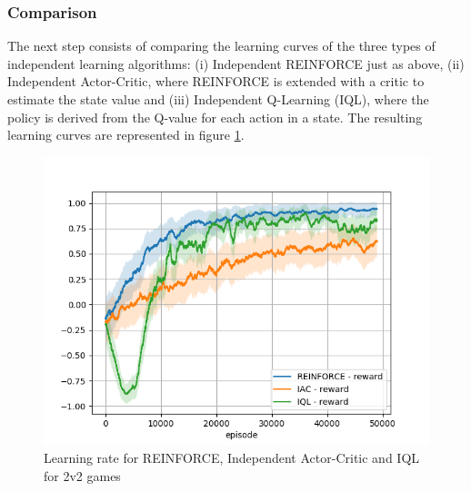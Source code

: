 \subsubsection*{Comparison}
The next step consists of comparing the learning curves of the three types of independent learning algorithms: (i) Independent REINFORCE just as above, (ii) Independent Actor-Critic, where REINFORCE is extended with a critic to estimate the state value and (iii) Independent Q-Learning (IQL), where the policy is derived from the Q-value for each action in a state. The resulting learning curves are represented in figure \ref{fig:compare_reward}.

\begin{figure}[htp]
    \centering
    \includegraphics[width=14cm]{images/experiment4/compare_reward.png}
    \caption{Learning rate for REINFORCE, Independent Actor-Critic and IQL for 2v2 games}
    \label{fig:compare_reward}
\end{figure}

